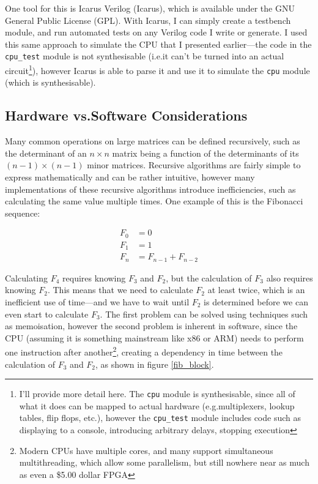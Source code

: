 \documentclass[12pt]{article}
\begin{document}
One tool for this is Icarus Verilog (Icarus), which is available under the GNU General Public License (GPL). With Icarus, I can simply create a testbench module, and run automated tests on any Verilog code I write or generate. I used this same approach to simulate the CPU that I presented earlier---the code in the \lstinline[language=Verilog]|cpu_test| module is not synthesisable (i.e.\@ it can't be turned into an actual circuit\footnote{I'll provide more detail here. The \lstinline[language=Verilog]|cpu| module is synthesisable, since all of what it does can be mapped to actual hardware (e.g.\@ multiplexers, lookup tables, flip flops, etc.\@), however the \lstinline[language=Verilog]|cpu_test| module includes code such as displaying to a console, introducing arbitrary delays, stopping execution}), however Icarus is able to parse it and use it to simulate the \lstinline[language=Verilog]|cpu| module (which is synthesisable).

\subsection{Hardware vs.\@ Software Considerations}

Many common operations on large matrices can be defined recursively, such as the determinant of an $n \times n$ matrix being a function of the determinants of its $(n-1) \times (n-1)$ minor matrices. Recursive algorithms are fairly simple to express mathematically and can be rather intuitive, however many implementations of these recursive algorithms introduce inefficiencies, such as calculating the same value multiple times. One example of this is the Fibonacci sequence:

\begin{align}
	F_0 &= 0 \\
	F_1 &= 1 \\
	F_n &= F_{n-1} + F_{n-2}
\end{align}

\noindent Calculating $F_4$ requires knowing $F_3$ and $F_2$, but the calculation of $F_3$ also requires knowing $F_2$. This means that we need to calculate $F_2$ at least twice, which is an inefficient use of time---and we have to wait until $F_2$ is determined before we can even start to calculate $F_3$. The first problem can be solved using techniques such as memoisation, however the second problem is inherent in software, since the CPU (assuming it is something mainstream like x86 or ARM) needs to perform one instruction after another\footnote{Modern CPUs have multiple cores, and many support simultaneous multithreading, which allow some parallelism, but still nowhere near as much as even a \$5.00 dollar FPGA}, creating a dependency in time between the calculation of $F_3$ and $F_2$, as shown in figure \ref{fib_block}.
\end{document}
